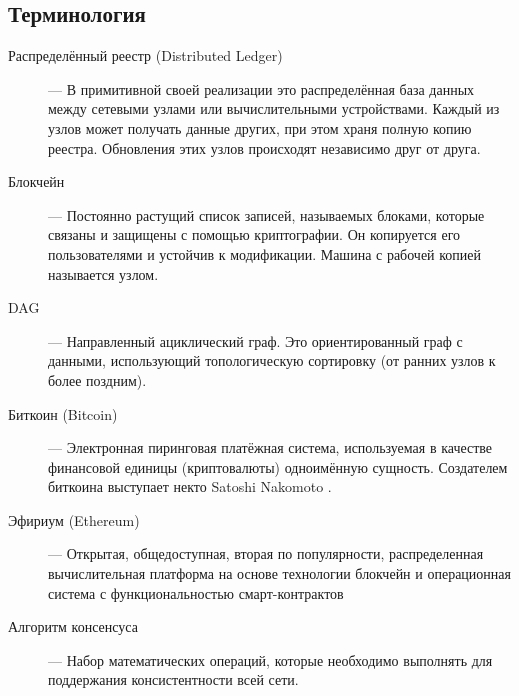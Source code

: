 \newpage
\subsection{Терминология}
\begin{description}
    \item[Распределённый реестр (Distributed Ledger)] ---
        В примитивной своей реализации это распределённая база данных между
        сетевыми узлами или вычислительными устройствами.
        Каждый из узлов может получать данные других, при этом храня полную
        копию реестра. Обновления этих узлов происходят независимо друг от
        друга.

    \item[Блокчейн] ---
        Постоянно растущий список записей, называемых блоками, которые связаны
        и защищены с помощью криптографии. Он копируется его пользователями и
        устойчив к модификации. Машина с рабочей копией называется узлом.

    \item[DAG] ---
        Направленный ациклический граф. Это ориентированный граф с данными,
        использующий топологическую сортировку (от ранних узлов к более поздним).

    \item[Биткоин (Bitcoin)] ---
        Электронная пиринговая платёжная система, используемая в качестве
        финансовой единицы (криптовалюты) одноимённую сущность. Создателем
        биткоина выступает некто Satoshi Nakomoto \cite{Nakamoto2008}.

    \item[Эфириум (Ethereum)] ---
        Открытая, общедоступная, вторая по популярности, распределенная
        вычислительная платформа на основе технологии блокчейн и операционная
        система с функциональностью смарт-контрактов
        \cite{VitalikButerin2015}

    \item[Алгоритм консенсуса] ---
        Набор математических операций, которые необходимо выполнять для
        поддержания консистентности всей сети.
\end{description}

